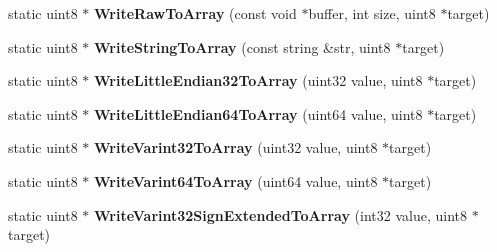 \begin{DoxyCompactItemize}
\item 
\mbox{\label{classgoogle_1_1protobuf_1_1io_1_1CodedOutputStream_a9380a3dbcfcc7fb403767208090dd45b}} 
static uint8 $\ast$ {\bfseries Write\+Raw\+To\+Array} (const void $\ast$buffer, int size, uint8 $\ast$target)
\item 
\mbox{\label{classgoogle_1_1protobuf_1_1io_1_1CodedOutputStream_a7cc70ccd6f2a995968f047e4f72d2782}} 
static uint8 $\ast$ {\bfseries Write\+String\+To\+Array} (const string \&str, uint8 $\ast$target)
\item 
\mbox{\label{classgoogle_1_1protobuf_1_1io_1_1CodedOutputStream_a4c24f6be2171292c6e7d69ac54d4dbaa}} 
static uint8 $\ast$ {\bfseries Write\+Little\+Endian32\+To\+Array} (uint32 value, uint8 $\ast$target)
\item 
\mbox{\label{classgoogle_1_1protobuf_1_1io_1_1CodedOutputStream_a96d329f453bf6f45011307afcd63079a}} 
static uint8 $\ast$ {\bfseries Write\+Little\+Endian64\+To\+Array} (uint64 value, uint8 $\ast$target)
\item 
\mbox{\label{classgoogle_1_1protobuf_1_1io_1_1CodedOutputStream_ac2b69d7c332e682f16c5dcd2c99b197a}} 
static uint8 $\ast$ {\bfseries Write\+Varint32\+To\+Array} (uint32 value, uint8 $\ast$target)
\item 
\mbox{\label{classgoogle_1_1protobuf_1_1io_1_1CodedOutputStream_a6cdeb49fe9e4910e2fc2ffb5a87667a7}} 
static uint8 $\ast$ {\bfseries Write\+Varint64\+To\+Array} (uint64 value, uint8 $\ast$target)
\item 
\mbox{\label{classgoogle_1_1protobuf_1_1io_1_1CodedOutputStream_a64719959d1b324c3731a23154a1420bc}} 
static uint8 $\ast$ {\bfseries Write\+Varint32\+Sign\+Extended\+To\+Array} (int32 value, uint8 $\ast$target)
\item 
\mbox{\label{classgoogle_1_1protobuf_1_1io_1_1CodedOutputStream_a5d62d28d4778710c5fd4bb0af99db94d}} 

\end{DoxyCompactItemize}
